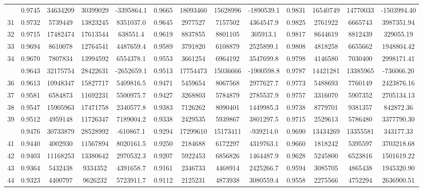\documentclass[
  12pt,
]{article}
\begin{document}
\begin{longtable}[t]{lcccccccccccc}
\addlinespace
30 & 0.9745 & 34634209 & 30399029 & -3395864.1 & 0.9665 & 18093460 & 15628996 & -1890539.1 & 0.9831 & 16540749 & 14770033 & -1503994.40\\
31 & 0.9732 & 5739449 & 13823245 & 8351037.0 & 0.9645 & 2977527 & 7157502 & 4364547.9 & 0.9825 & 2761922 & 6665743 & 3987351.94\\
32 & 0.9715 & 17482474 & 17613544 & 638551.4 & 0.9619 & 8837855 & 8801105 & 305913.1 & 0.9817 & 8644619 & 8812439 & 329055.19\\
33 & 0.9694 & 8610078 & 12764541 & 4487659.4 & 0.9589 & 3791820 & 6108879 & 2525899.1 & 0.9808 & 4818258 & 6655662 & 1948804.42\\
34 & 0.9670 & 7807834 & 13994592 & 6554378.1 & 0.9553 & 3661254 & 6964192 & 3547699.8 & 0.9798 & 4146580 & 7030400 & 2998171.41\\
\addlinespace
35 & 0.9643 & 32175754 & 28422631 & -2652659.1 & 0.9513 & 17754473 & 15036666 & -1900598.8 & 0.9787 & 14421281 & 13385965 & -736066.20\\
36 & 0.9613 & 10948347 & 15827717 & 5409816.5 & 0.9471 & 5459654 & 8067568 & 2977627.7 & 0.9773 & 5488693 & 7760149 & 2423876.16\\
37 & 0.9581 & 6584873 & 11692231 & 5500975.7 & 0.9427 & 3268803 & 5784879 & 2785537.9 & 0.9757 & 3316070 & 5907352 & 2705134.13\\
38 & 0.9547 & 15905963 & 17471758 & 2340577.8 & 0.9383 & 7126262 & 8090401 & 1449985.3 & 0.9738 & 8779701 & 9381357 & 842872.36\\
39 & 0.9512 & 4959148 & 11726347 & 7189004.2 & 0.9338 & 2429535 & 5939867 & 3801297.5 & 0.9715 & 2529613 & 5786480 & 3377790.30\\
\addlinespace
40 & 0.9476 & 30733879 & 28528992 & -610867.1 & 0.9294 & 17299610 & 15173411 & -939214.0 & 0.9690 & 13434269 & 13355581 & 343177.33\\
41 & 0.9440 & 4002930 & 11567894 & 8020161.5 & 0.9250 & 2184688 & 6172297 & 4319763.1 & 0.9660 & 1818242 & 5395597 & 3703218.68\\
42 & 0.9403 & 11168253 & 13380642 & 2970532.3 & 0.9207 & 5922453 & 6856826 & 1464487.9 & 0.9628 & 5245800 & 6523816 & 1501619.22\\
43 & 0.9364 & 5432438 & 9334352 & 4391658.7 & 0.9161 & 2346733 & 4468914 & 2425266.7 & 0.9594 & 3085705 & 4865438 & 1945320.90\\
44 & 0.9323 & 4400797 & 9626232 & 5723911.7 & 0.9112 & 2125231 & 4873938 & 3080559.4 & 0.9558 & 2275566 & 4752294 & 2636900.51\\

\end{longtable}
\end{document}
